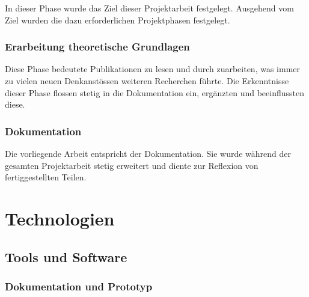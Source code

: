 In dieser Phase wurde das Ziel dieser Projektarbeit festgelegt.
Ausgehend vom Ziel wurden die dazu erforderlichen Projektphasen
festgelegt.

\subsubsection{Erarbeitung theoretische Grundlagen}
\label{ssubsec:theoretical_background}

Diese Phase bedeutete Publikationen zu lesen und durch zuarbeiten, was 
immer zu vielen neuen Denkanstössen weiteren Recherchen führte. Die
Erkenntnisse dieser Phase flossen stetig in die Dokumentation ein,
ergänzten und beeinflussten diese.

\subsubsection{Dokumentation}
\label{ssubsec:documentation}

Die vorliegende Arbeit entspricht der Dokumentation. Sie wurde während
der gesamten Projektarbeit stetig erweitert und diente zur Reflexion von
fertiggestellten Teilen.

\section{Technologien}
\label{sec:technologies}

\subsection{Tools und Software}
\label{subsec:tools_software}

\subsubsection{Dokumentation und Prototyp}
\label{ssubsec:tools_software:documentation_prototype}

